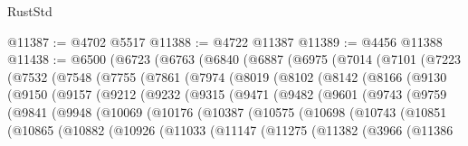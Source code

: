 \begin{lexlean}{RustStd}
\begin{coremodule}
@11387 := @4702 @5517
@11388 := @4722 @11387
@11389 := @4456 @11388
@11438 := @6500
    (@6723
      (@6763
        (@6840
          (@6887
            (@6975
              (@7014
                (@7101
                  (@7223
                    (@7532
                      (@7548
                        (@7755
                          (@7861
                            (@7974
                              (@8019
                                (@8102
                                  (@8142
                                    (@8166
                                      (@9130
                                        (@9150
                                          (@9157
                                            (@9212
                                              (@9232
                                                (@9315
                                                  (@9471
                                                    (@9482
                                                      (@9601
                                                        (@9743
                                                          (@9759
                                                            (@9841
                                                              (@9948
                                                                (@10069
                                                                  (@10176
                                                                    (@10387
                                                                      (@10575
                                                                        (@10698
                                                                          (@10743
                                                                            (@10851
                                                                              (@10865
                                                                                (@10882
                                                                                  (@10926
                                                                                    (@11033
                                                                                      (@11147
                                                                                        (@11275
                                                                                          (@11382
                                                                                            (@3966
                                                                                              (@11386

\end{coremodule}
\end{lexlean}
